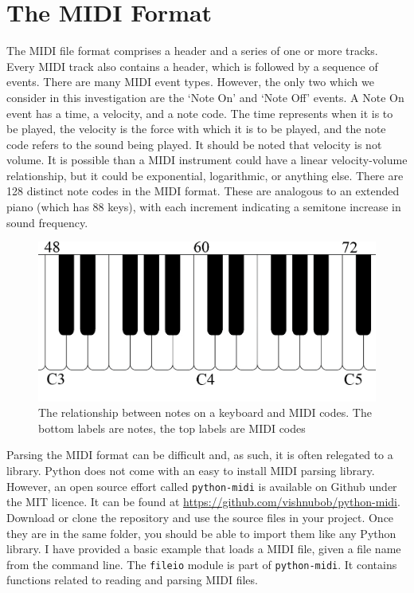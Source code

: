 \documentclass[10pt]{book}
\begin{document}
\section{The MIDI Format}

The MIDI file format comprises a header and a series of one or more tracks. Every MIDI track also contains a header, which is followed by a sequence of events. There are many MIDI event types. However, the only two which we consider in this investigation are the `Note On' and `Note Off' events. A Note On event has a time, a velocity, and a note code. The time represents when it is to be played, the velocity is the force with which it is to be played, and the note code refers to the sound being played. It should be noted that velocity is not volume. It is possible than a MIDI instrument could have a linear velocity-volume relationship, but it could be exponential, logarithmic, or anything else. There are 128 distinct note codes in the MIDI format. These are analogous to an extended piano (which has 88 keys), with each increment indicating a semitone increase in sound frequency.

\begin{figure}
	\centering
  \includegraphics[scale=0.3]{Keyslol}
  \caption{The relationship between notes on a keyboard and MIDI codes. The bottom labels are notes, the top labels are MIDI codes}\label{fig:keys}
\end{figure}

Parsing the MIDI format can be difficult and, as such, it is often relegated to a library. Python does not come with an easy to install MIDI parsing library. However, an open source effort called \texttt{python-midi} is available on Github under the MIT licence. It can be found at \url{https://github.com/vishnubob/python-midi}. Download or clone the repository and use the source files in your project. Once they are in the same folder, you should be able to import them like any Python library. I have provided a basic example that loads a MIDI file, given a file name from the command line. The \texttt{fileio} module is part of \texttt{python-midi}. It contains functions related to reading and parsing MIDI files.
\end{document}
